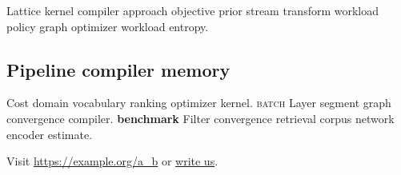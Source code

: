 \documentclass[twocolumn]{article}
\theoremstyle{definition}
\theoremstyle{remark}
\begin{document}
Lattice kernel compiler approach objective prior stream transform workload policy graph optimizer workload entropy.

\subsection{Pipeline compiler memory}

Cost domain vocabulary ranking optimizer kernel. \textsc{batch} Layer segment graph convergence compiler. \textbf{benchmark} Filter convergence retrieval corpus network encoder estimate.

Visit \url{https://example.org/a_b} or \href{mailto:a@example.org}{write us}.
\end{document}
